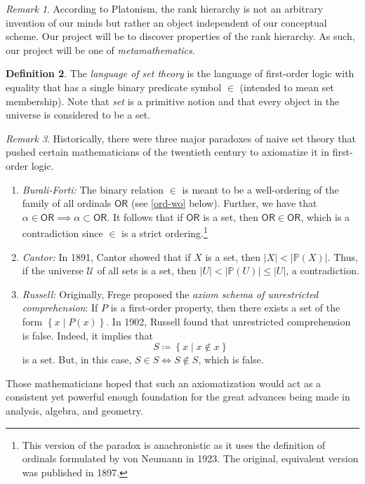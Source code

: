 \documentclass[10pt,letterpaper,cm]{nupset}
\theoremstyle{definition}
\newtheorem{definition}{Definition}[subsection]
\theoremstyle{theorem}
\theoremstyle{remark}
\newtheorem{remark}[definition]{Remark}
\renewcommand{\P}{\mathbb P}
\newcommand{\1}{\mathbf{1}}
\newcommand{\0}{\vec 0}
\newcommand{\ord}{\mathsf{OR}}
\begin{document}
\begin{remark}
According to Platonism, the rank hierarchy is not an arbitrary invention of our minds but rather an object independent of our conceptual scheme. Our project will be to discover properties of the rank hierarchy. As such, our project will be one of \emph{metamathematics}. 
\end{remark}


\begin{definition}
The \textit{language of set theory} is the language of first-order logic with equality that has a single binary predicate symbol $\in$ (intended to mean set membership). Note that \textit{set} is a primitive notion and that every object in the universe is considered to be a set.
\end{definition}

\begin{remark}\label{paradox}
Historically, there were three major paradoxes of naive set theory that pushed certain mathematicians of the twentieth century to axiomatize it in first-order logic. 
\begin{enumerate}
\item \textit{Burali-Forti:} The binary relation $\in$ is meant to be a well-ordering of the family of all ordinals $\ord$ (see \cref{ord-wo} below). Further, we have that $\alpha \in \ord \implies \alpha \subset \ord$. It follows that if $\ord$ is a set, then $\ord \in \ord$, which is a contradiction since $\in$ is a strict ordering.\footnote{This version of the paradox is anachronistic as it uses the definition of ordinals formulated by von Neumann in 1923. The original, equivalent version was published in 1897.} 
\item \textit{Cantor:} In 1891, Cantor showed that if $X$ is a set, then $\left\lvert{X}\right\rvert < \left\lvert{\P(X)}\right\rvert$. Thus, if the universe $\mathcal{U}$ of all sets is a set, then $\left\lvert{U}\right\rvert < \left\lvert{\P(U)}\right\rvert \leq \left\lvert{U}\right\rvert$, a contradiction. 
\item \textit{Russell:} Originally, Frege proposed the \textit{axiom schema of unrestricted comprehension}: If $P$ is a first-order property, then there exists a set of the form $\left\{x \mid P(x)\right\}$. In 1902, Russell found that unrestricted comprehension is false. Indeed,  it implies that $$S \coloneqq \left\{x \mid x \notin x\right\}$$ is a set. But, in this case, $S \in S  \iff S \notin S$, which is false. 
\end{enumerate}
Those mathematicians hoped that such an axiomatization would act as a consistent yet powerful enough foundation for the great advances being made in analysis, algebra, and geometry.
\end{remark}
\end{document}
